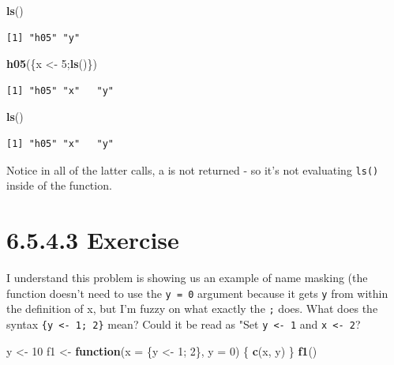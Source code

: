 \documentclass[]{book}
\newenvironment{Shaded}{\begin{snugshade}}{\end{snugshade}}
\newcommand{\ControlFlowTok}[1]{\textcolor[rgb]{0.13,0.29,0.53}{\textbf{#1}}}
\newcommand{\DataTypeTok}[1]{\textcolor[rgb]{0.13,0.29,0.53}{#1}}
\newcommand{\DecValTok}[1]{\textcolor[rgb]{0.00,0.00,0.81}{#1}}
\newcommand{\KeywordTok}[1]{\textcolor[rgb]{0.13,0.29,0.53}{\textbf{#1}}}
\newcommand{\NormalTok}[1]{#1}
\newcommand{\StringTok}[1]{\textcolor[rgb]{0.31,0.60,0.02}{#1}}
\begin{document}
\begin{Shaded}
\begin{Highlighting}[]
\KeywordTok{ls}\NormalTok{()}
\end{Highlighting}
\end{Shaded}

\begin{verbatim}
[1] "h05" "y" 
\end{verbatim}

\begin{Shaded}
\begin{Highlighting}[]
\KeywordTok{h05}\NormalTok{(\{x <-}\StringTok{ }\DecValTok{5}\NormalTok{;}\KeywordTok{ls}\NormalTok{()\})}
\end{Highlighting}
\end{Shaded}

\begin{verbatim}
[1] "h05" "x"   "y" 
\end{verbatim}

\begin{Shaded}
\begin{Highlighting}[]
\KeywordTok{ls}\NormalTok{()}
\end{Highlighting}
\end{Shaded}

\begin{verbatim}
[1] "h05" "x"   "y" 
\end{verbatim}

Notice in all of the latter calls, a is not returned - so it's not evaluating \texttt{ls()} inside of the function.

\hypertarget{exercise-2}{%
\section*{6.5.4.3 Exercise}\label{exercise-2}}

I understand this problem is showing us an example of name masking (the function doesn't need to use the \texttt{y\ =\ 0} argument because it gets \texttt{y} from within the definition of x, but I'm fuzzy on what exactly the \texttt{;} does. What does the syntax \texttt{\{y\ \textless{}-\ 1;\ 2\}} mean? Could it be read as "Set \texttt{y\ \textless{}-\ 1} and \texttt{x\ \textless{}-\ 2}?

\begin{Shaded}
\begin{Highlighting}[]
\NormalTok{y <-}\StringTok{ }\DecValTok{10}
\NormalTok{f1 <-}\StringTok{ }\ControlFlowTok{function}\NormalTok{(}\DataTypeTok{x =}\NormalTok{ \{y <-}\StringTok{ }\DecValTok{1}\NormalTok{; }\DecValTok{2}\NormalTok{\}, }\DataTypeTok{y =} \DecValTok{0}\NormalTok{) \{}
  \KeywordTok{c}\NormalTok{(x, y)}
\NormalTok{\}}
\KeywordTok{f1}\NormalTok{()}
\end{Highlighting}
\end{Shaded}
\end{document}
